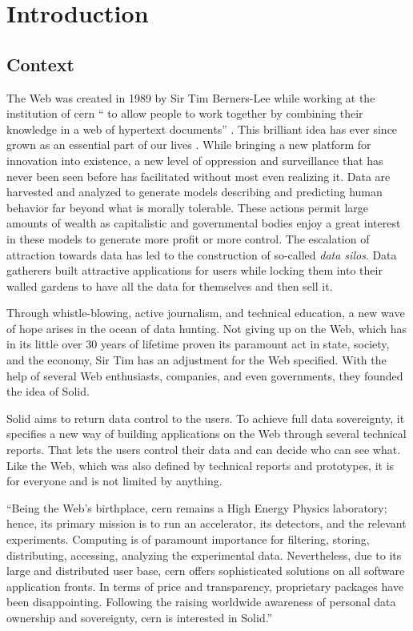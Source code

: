 \chapter{Introduction}
\section{Context}

The Web was created in 1989 by Sir Tim Berners-Lee while working at the institution of \gls{cern} “\textelp{} to allow people to work together by combining their knowledge in a web of hypertext documents” \cite{timbl-bio}. This brilliant idea has ever since grown as an essential part of our lives \cite{cern-solid-investigation-spec}. While bringing a new platform for innovation into existence, a new level of oppression and surveillance that has never been seen before has facilitated without most even realizing it. Data are harvested and analyzed to generate models describing and predicting human behavior far beyond what is morally tolerable. These actions permit large amounts of wealth as capitalistic and governmental bodies enjoy a great interest in these models to generate more profit or more control. The escalation of attraction towards data has led to the construction of so-called \textit{data silos}. Data gatherers built attractive applications for users while locking them into their walled gardens to have all the data for themselves and then sell it.

Through whistle-blowing, active journalism, and technical education, a new wave of hope arises in the ocean of data hunting. Not giving up on the Web, which has in its little over 30 years of lifetime proven its paramount act in state, society, and the economy, Sir Tim has an adjustment for the Web specified. With the help of several Web enthusiasts, companies, and even governments, they founded the idea of Solid.

Solid aims to return data control to the users. To achieve full data sovereignty, it specifies a new way of building applications on the Web through several technical reports. That lets the users control their data and can decide who can see what. Like the Web, which was also defined by technical reports and prototypes, it is for everyone and is not limited by anything.

“Being the Web’s birthplace, \gls{cern} remains a High Energy Physics laboratory; hence, its primary mission is to run an accelerator, its detectors, and the relevant experiments. Computing is of paramount importance for filtering, storing, distributing, accessing, analyzing the experimental data. Nevertheless, due to its large and distributed user base, \gls{cern} offers sophisticated solutions on all software application fronts. In terms of price and transparency, proprietary packages have been disappointing. Following the raising worldwide awareness of personal data ownership and sovereignty, \gls{cern} is interested in Solid.” \cite{cern-solid-investigation-spec}

